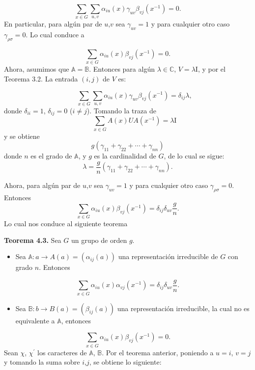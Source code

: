 \documentclass[12pt]{book}
\theoremstyle{definition}
\newcounter{in}
\begin{document}
\begin{equation*}
 \sum_{x \in G} \sum_{u,v} \alpha_{iu}(x) \gamma_{uv} \beta_{vj}(x^{-1}) = 0.
\end{equation*}
En particular, para algún par de $u$,$v$ sea $\gamma_{uv}=1$ y para
cualquier otro caso $\gamma_{\rho \sigma}=0$. Lo cual conduce a

\begin{equation*}
  \sum_{x \in G} \alpha_{iu}(x) \beta_{vj}(x^{-1}) = 0.
\end{equation*}
Ahora, asumimos que $\mathbb{A}=\mathbb{B}$. Entonces para algún
$\lambda \in \mathbb{C}$, $V=\lambda\mathrm{I}$, y por el Teorema
3.2. La entrada $(i,j)$ de $V$ es:

\begin{equation*}
\qquad \sum_{x \in G} \sum_{u,v} \alpha_{iu}(x) \gamma_{uv} \beta_{vj}(x^{-1}) = \delta_{ij}\lambda,
\end{equation*}
donde $\delta_{ii}=1$, $\delta_{ij}=0$ ($i \neq j$). Tomando la traza de
\begin{equation*}
\qquad \sum_{x \in G} A(x)UA(x^{-1}) = \lambda \mathrm{I}
\end{equation*}
y se obtiene
\begin{equation*}
  g(\gamma_{11}+\gamma_{22}+ \cdots +\gamma_{nn})
\end{equation*}  
donde $n$ es el grado de $\mathbb{A}$, y $g$ es la cardinalidad de $G$, de lo cual se sigue:
\begin{equation*}
\lambda=\frac{g}{n}(\gamma_{11}+\gamma_{22}+ \cdots + \gamma_{nn}).
\end{equation*}

Ahora, para algún par de $u$,$v$ sea $\gamma_{uv}=1$ y para cualquier otro caso $\gamma_{\rho \sigma}=0$. Entonces
\begin{equation*}
  \sum_{x \in G} \alpha_{iu}(x) \beta_{vj}(x^{-1}) = \delta_{ij} \delta_{uv}\frac{g}{n}.
\end{equation*}
Lo cual nos conduce al siguiente teorema

\textbf{Teorema 4.3. } Sea $G$ un grupo de orden $g$.
\begin{itemize}
\item Sea $\mathbb{A}: a \rightarrow A(a)=(\alpha_{ij}(a))$ una
  representación irreducible de $G$ con grado $n$. Entonces
\end{itemize}
\begin{equation*}
\sum_{x \in G} \alpha_{iu}(x) \alpha_{vj}(x^{-1}) = \delta_{ij} \delta_{uv}\frac{g}{n}.
\end{equation*}
\begin{itemize}
\item Sea $\mathbb{B}:b \rightarrow B(a)=(\beta_{ij}(a))$ una
  representación irreducible, la cual no es equivalente a
  $\mathbb{A}$, entonces
\end{itemize}
\begin{equation*}
\sum_{x \in G} \alpha_{iu}(x) \beta_{vj}(x^{-1}) = 0.
\end{equation*}
Sean $\chi$, $\chi^{'}$ los caracteres de $\mathbb{A}$,
$\mathbb{B}$. Por el teorema anterior, poniendo a $u=i$, $v=j$ y
tomando la suma sobre $i$,$j$, se obtiene lo siguiente:
\end{document}
